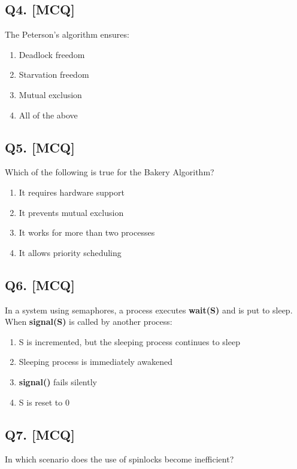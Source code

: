 \subsection*{Q4. [MCQ]}
The Peterson's algorithm ensures:

\begin{enumerate}[label=(\alph*)]
    \item Deadlock freedom
    \item Starvation freedom
    \item Mutual exclusion
    \item All of the above
\end{enumerate}

\subsection*{Q5. [MCQ]}
Which of the following is true for the Bakery Algorithm?

\begin{enumerate}[label=(\alph*)]
    \item It requires hardware support
    \item It prevents mutual exclusion
    \item It works for more than two processes
    \item It allows priority scheduling
\end{enumerate}

\subsection*{Q6. [MCQ]}
In a system using semaphores, a process executes \textbf{wait(S)} and is put to sleep. When \textbf{signal(S)} is called by another process:

\begin{enumerate}[label=(\alph*)]
    \item S is incremented, but the sleeping process continues to sleep
    \item Sleeping process is immediately awakened
    \item \textbf{signal()} fails silently
    \item S is reset to 0
\end{enumerate}

\subsection*{Q7. [MCQ]}
In which scenario does the use of spinlocks become inefficient?

